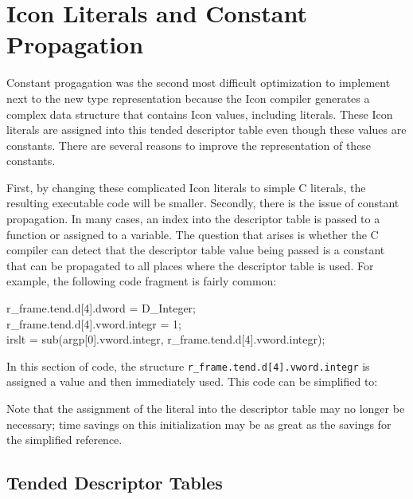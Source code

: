 \section{Icon Literals and Constant Propagation}

Constant progagation was the second most difficult optimization to
implement next to the new type representation because the Icon
compiler generates a complex data structure that contains Icon values,
including literals. These Icon literals are assigned into this tended
descriptor table even though these values are constants. There are
several reasons to improve the representation of these constants.

First, by changing these complicated Icon literals to simple C
literals, the resulting executable code will be smaller. Secondly,
there is the issue of constant propagation. In many cases, an index
into the descriptor table is passed to a function or assigned to a
variable. The question that arises is whether the C compiler can
detect that the descriptor table value being passed is a constant that
can be propagated to all places where the descriptor table is used.
For example, the following code fragment is fairly common:

\begin{iconcode}
r\_frame.tend.d[4].dword = D\_Integer;\\
r\_frame.tend.d[4].vword.integr = 1;\\
irslt = sub(argp[0].vword.integr, r\_frame.tend.d[4].vword.integr);
\end{iconcode}

In this section of code, the structure
\texttt{r\_frame.tend.d[4].vword.integr} is assigned a value and then
immediately used. This code can be simplified to:



Note that the assignment of the literal into the descriptor table may
no longer be necessary; time savings on this initialization may be as
great as the savings for the simplified reference.


\subsection{Tended Descriptor Tables}

